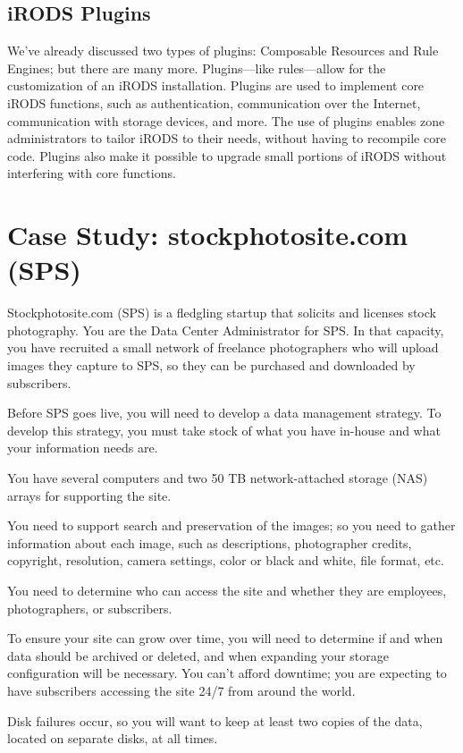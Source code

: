 \documentclass[10pt,oneside]{memoir}
\begin{document}
\section{iRODS Plugins}

We've already discussed two types of plugins: Composable Resources and Rule Engines; but there are many more. Plugins---like rules---allow for the customization of an iRODS installation. Plugins are used to implement core iRODS functions, such as authentication, communication over the Internet, communication with storage devices, and more. The use of plugins enables zone administrators to tailor iRODS to their needs, without having to recompile core code. Plugins also make it possible to upgrade small portions of iRODS without interfering with core functions.

\chapter{Case Study: stockphotosite.com (SPS)}

Stockphotosite.com (SPS) is a fledgling startup that solicits and licenses stock photography. You are the Data Center Administrator for SPS. In that capacity, you have recruited a small network of freelance photographers who will upload images they capture to SPS, so they can be purchased and downloaded by subscribers.

Before SPS goes live, you will need to develop a data management strategy. To develop this strategy, you must take stock of what you have in-house and what your information needs are.

You have several computers and two 50 TB network-attached storage (NAS) arrays for supporting the site.

You need to support search and preservation of the images; so you need to gather information about each image, such as descriptions, photographer credits, copyright, resolution, camera settings, color or black and white, file format, etc.

You need to determine who can access the site and whether they are employees, photographers, or subscribers.

To ensure your site can grow over time, you will need to determine if and when data should be archived or deleted, and when expanding your storage configuration will be necessary. You can't afford downtime; you are expecting to have subscribers accessing the site 24/7 from around the world.

Disk failures occur, so you will want to keep at least two copies of the data, located on separate disks, at all times.
\end{document}
